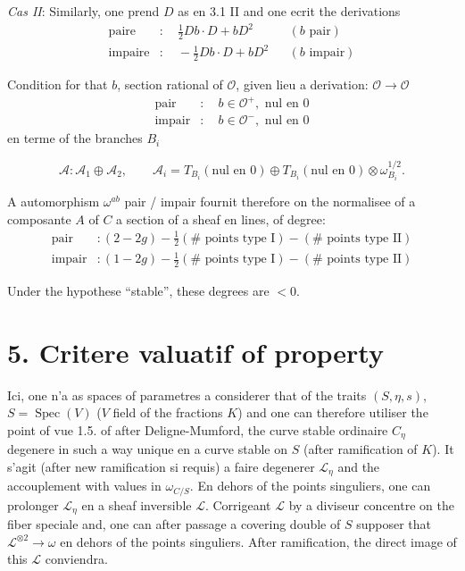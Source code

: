 \documentclass[11pt,a4paper]{article}
\theoremstyle{plain}
\theoremstyle{definition}
\DeclareMathOperator{\Spec}{Spec}
\begin{document}
\newpage

\noindent \textit{Cas II}: Similarly, one prend $D$ as en 3.1 II and one ecrit the derivations
\[
\begin{aligned}
\text{paire} &: \quad \tfrac{1}{2} Db \cdot D + bD^2 && (b \text{ pair}) \\
\text{impaire} &: \quad -\tfrac{1}{2} Db \cdot D + bD^2 && (b \text{ impair})
\end{aligned}
\]

Condition for that $b$, section rational of $\mathcal{O}$, given lieu a derivation: $\mathcal{O} \to \mathcal{O}$
\[
\begin{aligned}
\text{pair} &: \quad b \in \mathcal{O}^+, \text{ nul en } 0 \\
\text{impair} &: \quad b \in \mathcal{O}^-, \text{ nul en } 0
\end{aligned}
\]
\hfill en terme of the branches $B_i$

\[
\mathcal{A} : \mathcal{A}_1 \oplus \mathcal{A}_2, \qquad \mathcal{A}_i = T_{B_i}(\text{nul en } 0) \oplus T_{B_i}(\text{nul en } 0) \otimes \omega_{B_i}^{1/2}.
\]

A automorphism $\omega^{ab}$ pair / impair fournit therefore on the normalisee of a composante $A$ of $C$ a section of a sheaf en lines, of degree:
\[
\begin{aligned}
\text{pair} &: (2 - 2g) - \tfrac{1}{2}(\# \text{ points type I}) - (\# \text{ points type II}) \\
\text{impair} &: (1 - 2g) - \tfrac{1}{2}(\# \text{ points type I}) - (\# \text{ points type II})
\end{aligned}
\]

Under the hypothese ``stable'', these degrees are $< 0$.

\newpage

\section*{5. Critere valuatif of property}

Ici, one n'a as spaces of parametres a considerer that of the traits $(S,\eta,s)$, $S = \Spec(V)$ ($V$ field of the fractions $K$) and one can therefore utiliser the point of vue 1.5. of after Deligne-Mumford, the curve stable ordinaire $C_\eta$ degenere in such a way unique en a curve stable on $S$ (after ramification of $K$). It s'agit (after new ramification si requis) a faire degenerer $\mathcal{L}_\eta$ and the accouplement with values in $\omega_{C/S}$. En dehors of the points singuliers, one can prolonger $\mathcal{L}_\eta$ en a sheaf inversible $\mathcal{L}$. Corrigeant $\mathcal{L}$ by a diviseur concentre on the fiber speciale and, one can after passage a covering double of $S$ supposer that $\mathcal{L}^{\otimes 2} \to \omega$ en dehors of the points singuliers. After ramification, the direct image of this $\mathcal{L}$ conviendra.
\end{document}
